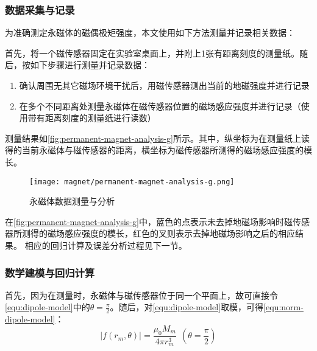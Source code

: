 \subsubsection{数据采集与记录}
为准确测定永磁体的磁偶极矩强度，本文使用如下方法测量并记录相关数据：

首先，将一个磁传感器固定在实验室桌面上，并附上1张有距离刻度的测量纸。随后，按如下步骤进行测量并记录数据：
\begin{enumerate}[label=(\alph*)]
    \item 确认周围无其它磁场环境干扰后，用磁传感器测出当前的地磁强度并进行记录
    \item 在多个不同距离处测量永磁体在磁传感器位置的磁场感应强度并进行记录（使用带有距离刻度的测量纸进行读数）
\end{enumerate}

测量结果如\autoref{fig:permanent-magnet-analysis-g}所示。其中，纵坐标为在测量纸上读得的当前永磁体与磁传感器的距离，横坐标为磁传感器所测得的磁场感应强度的模长。

\begin{figure}[H]
    \centering
    \texttt{[image: magnet/permanent-magnet-analysis-g.png]}
    \caption{\label{fig:permanent-magnet-analysis-g}永磁体数据测量与分析}
\end{figure} 

在\autoref{fig:permanent-magnet-analysis-g}中，蓝色的点表示未去掉地磁场影响时磁传感器所测得的磁场感应强度的模长，红色的叉则表示去掉地磁场影响之后的相应结果。
相应的回归计算及误差分析过程见下一节。

\subsubsection{数学建模与回归计算}
首先，因为在测量时，永磁体与磁传感器位于同一个平面上，故可直接令\autoref{equ:dipole-model}中的$\theta = \frac{\pi}{2}$。随后，对\autoref{equ:dipole-model}取模，可得\autoref{equ:norm-dipole-model}：
\begin{equation}
    \label{equ:norm-dipole-model}
    |f(r_m, \theta)| = \frac{\mu_0 M_m}{4\pi r_m^3}\ \ (\theta = \frac{\pi}{2})
\end{equation}


